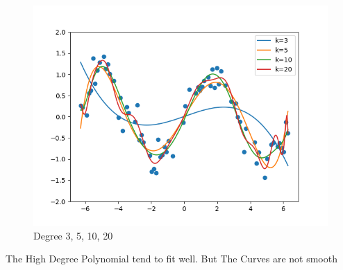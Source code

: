 \begin{answer}
\\ \\ 

\begin{figure}[h!]
\centering
  \includegraphics[width=.7\linewidth]{featuremaps/5c.png}
\caption{Degree 3, 5, 10, 20}
\label{fig:test}
\end{figure}
The High Degree Polynomial tend to fit well. But The Curves are not smooth 
\end{answer}
